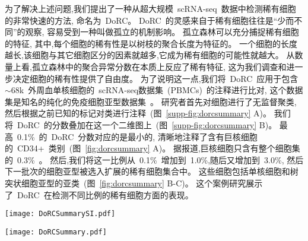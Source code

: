 为了解决上述问题,我们提出了一种从超大规模~scRNA-seq~数据中检测稀有细胞的非常快速的方法,
命名为~DoRC。
DoRC~的灵感来自于稀有细胞往往是``少而不同”的观察, 容易受到一种叫做孤立的机制影响。
孤立森林可以充分捕捉稀有细胞的特征,
其中,每个细胞的稀有性是以树枝的聚合长度为特征的。
一个细胞的长度越长,该细胞与其它细胞区分的因素就越多,它成为稀有细胞的可能性就越大。
从数量上看,孤立森林中的聚合异常分数在本质上反应了稀有特征,
这为我们调查和进一步决定细胞的稀有性提供了自由度。
为了说明这一点,我们将~DoRC~应用于包含~${\sim}68$k~外周血单核细胞的~scRNA-seq数据集~(PBMCs)~的注释进行比对,
这个数据集是知名的纯化的免疫细胞亚型数据集~\cite{zheng2017massively}。
研究者首先对细胞进行了无监督聚类,
然后根据之前已知的标记对类进行注释~(图~\ref{supp-fig:dorcsummary} A)。
我们将~DoRC~的分数叠加在这一个二维图上~(图~\ref{supp-fig:dorcsummary} B)。
最高~0.1\%~的~DoRC~分数对应的是最小的, 
清晰地注释了含有巨核细胞的~CD34+~类别~(图~\ref{fig:dorcsummary} A)。
据报道,巨核细胞只含有整个细胞集的~0.3\%~\cite{zheng2017massively}。
然后,我们将这一比例从~0.1\%~增加到~1.0\%,随后又增加到~3.0\%,
然后下一批次的细胞亚型被选入扩展的稀有细胞集合中。
这些细胞包括单核细胞和树突状细胞亚型的亚类~(图~\ref{fig:dorcsummary} B-C)。
这个案例研究展示了~DoRC~在检测不同比例的稀有细胞方面的表现。

\begin{figure*}[!htbp]
    \centering
    \texttt{[image: DoRCSummarySI.pdf]}
    \caption{
    DoRC在~PBMCs\_68k~上的性能评估。
    (A)~基于~t-SNE~的二维嵌入数据集可视化图,按~Zheng~等所报道的鉴定的不同类别用不同的颜色标记。
    (B)~PBMCs\_68k~上细胞的~DoRC~得分热图。巨核细胞群~(0.3\%),是所有细胞类型中最稀有的细胞,获得了最高的~DoRC~分数。
    (C)~使用~IQR-阈值标准的~DoRC~识别的稀有细胞。
    }
    \label{supp-fig:dorcsummary}
\end{figure*}

\begin{figure*}[!htbp]
    \centering
    \texttt{[image: DoRCSummary.pdf]}
    \caption{
    DoRC发现了不同稀有度的细胞。在~${\sim}68$k~PBMC~数据~\cite{zheng2017massively}~中,不同级别的稀有度对应了一个数量不断增加的稀有细胞群。
    (A-C)~根据~DoRC~得分选出的前~0.1\%、1.0\%~和~3.0\%~的细胞分别以高亮显示。    
    }
    \label{fig:dorcsummary}
\end{figure*}

